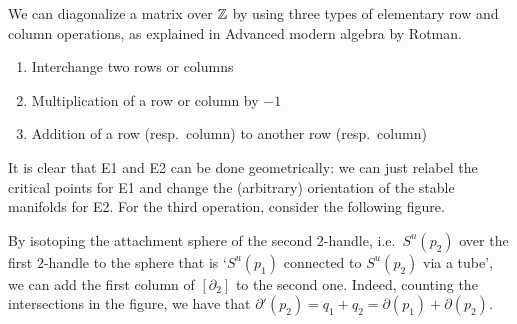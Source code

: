 We can diagonalize a matrix over $\mathbb{Z}$ by using three types of elementary row and column operations, as explained in Advanced modern algebra by Rotman.\sidenotemark
\begin{samepage}
\begin{enumerate}[E1]
    \item Interchange two rows or columns
    \item Multiplication of a row or column by $-1$
    \item Addition of a row (resp.~column) to another row (resp.~column)
\end{enumerate}
\end{samepage}
It is clear that E1 and E2 can be done geometrically: we can just relabel the critical points for E1 and change the (arbitrary) orientation of the stable manifolds for E2.
For the third operation, consider the following figure.
\begin{figure}[H]
    \centering
\end{figure}
By isotoping the attachment sphere of the second $2$-handle, i.e.\ $S^{u}(p_2)$ over the first $2$-handle to the sphere that is `$S^{u}(p_1)$ connected to $S^{u}(p_2)$ via a tube', we can add the first column of $[\partial_2]$ to the second one. Indeed, counting the intersections in the figure, we have that $\partial'(p_2) = q_1 + q_2 = \partial(p_1) + \partial(p_2)$.


